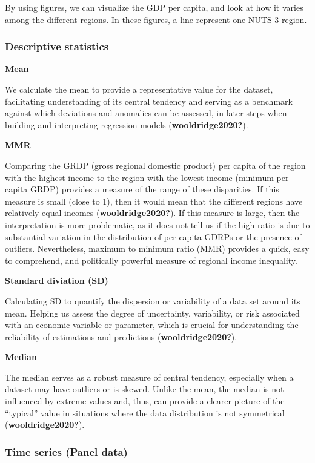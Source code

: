 \documentclass[
  a4paper,
  DIV=11,
  numbers=noendperiod]{scrartcl}
\begin{document}
By using figures, we can visualize the GDP per capita, and look at how
it varies among the different regions. In these figures, a line
represent one NUTS 3 region.

\hypertarget{descriptive-statistics}{%
\subsubsection{Descriptive statistics}\label{descriptive-statistics}}

\textbf{Mean}

We calculate the mean to provide a representative value for the dataset,
facilitating understanding of its central tendency and serving as a
benchmark against which deviations and anomalies can be assessed, in
later steps when building and interpreting regression models
(\textbf{wooldridge2020?}).

\textbf{MMR}

Comparing the GRDP (gross regional domestic product) per capita of the
region with the highest income to the region with the lowest income
(minimum per capita GRDP) provides a measure of the range of these
disparities. If this measure is small (close to 1), then it would mean
that the different regions have relatively equal incomes
(\textbf{wooldridge2020?}). If this measure is large, then the
interpretation is more problematic, as it does not tell us if the high
ratio is due to substantial variation in the distribution of per capita
GDRPs or the presence of outliers. Nevertheless, maximum to minimum
ratio (MMR) provides a quick, easy to comprehend, and politically
powerful measure of regional income inequality.

\textbf{Standard diviation (SD)}

Calculating SD to quantify the dispersion or variability of a data set
around its mean. Helping us assess the degree of uncertainty,
variability, or risk associated with an economic variable or parameter,
which is crucial for understanding the reliability of estimations and
predictions (\textbf{wooldridge2020?}).

\textbf{Median}

The median serves as a robust measure of central tendency, especially
when a dataset may have outliers or is skewed. Unlike the mean, the
median is not influenced by extreme values and, thus, can provide a
clearer picture of the ``typical'' value in situations where the data
distribution is not symmetrical (\textbf{wooldridge2020?}).

\hypertarget{time-series-panel-data}{%
\subsubsection{\texorpdfstring{\textbf{Time series (Panel
data)}}{Time series (Panel data)}}\label{time-series-panel-data}}
\end{document}
